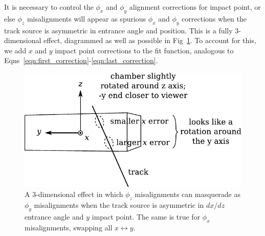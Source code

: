 \documentclass[12pt]{article}
\begin{document}
It is necessary to control the $\phi_x$ and $\phi_y$ alignment
corrections for impact point, or else $\phi_z$ misalignments will
appear as spurious $\phi_x$ and $\phi_y$ corrections when the track
source is asymmetric in entrance angle and position.  This is a fully
3-dimensional effect, diagrammed as well as possible in
Fig~\ref{fig:motivation_for_angle_controls}.  To account for this, we
add $x$ and $y$ impact point corrections to the fit function,
analogous to
Eqns~\ref{eqn:first_correction}-\ref{eqn:last_correction}.

\begin{figure}
\begin{center} \includegraphics[width=0.6\linewidth]{motivation_for_angle_controls.pdf} \end{center}
\caption{A 3-dimensional effect in which $\phi_z$ misalignments can masquerade as $\phi_y$ misalignments when the track source is asymmetric in $dx/dz$ entrance angle and $y$ impact point.  The same is true for $\phi_x$ misalignments, swapping all $x \leftrightarrow y$. \label{fig:motivation_for_angle_controls}}
\end{figure}
\end{document}
